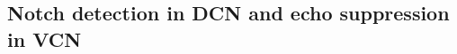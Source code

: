 \citep{ZhangOertel:1993b}



\subsection{Notch detection in DCN and echo suppression in VCN}








